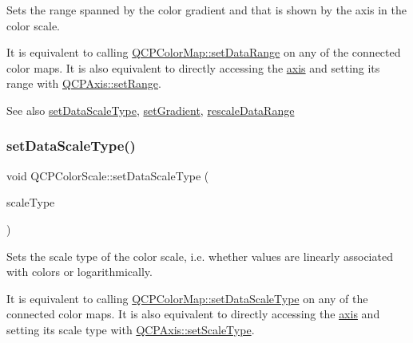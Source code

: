 Sets the range spanned by the color gradient and that is shown by the axis in the color scale.

It is equivalent to calling \mbox{\hyperlink{class_q_c_p_color_map_a980b42837821159786a85b4b7dcb8774}{Q\+C\+P\+Color\+Map\+::set\+Data\+Range}} on any of the connected color maps. It is also equivalent to directly accessing the \mbox{\hyperlink{class_q_c_p_color_scale_a39bdbdb3b212602a5a57f9f3ea444190}{axis}} and setting its range with \mbox{\hyperlink{class_q_c_p_axis_aebdfea5d44c3a0ad2b4700cd4d25b641}{Q\+C\+P\+Axis\+::set\+Range}}.

\begin{DoxySeeAlso}{See also}
\mbox{\hyperlink{class_q_c_p_color_scale_aeb6107d67dd7325145b2498abae67fc3}{set\+Data\+Scale\+Type}}, \mbox{\hyperlink{class_q_c_p_color_scale_a1f29583bb6f1e7f473b62fb712be3940}{set\+Gradient}}, \mbox{\hyperlink{class_q_c_p_color_scale_a425983db4478543924ddbd04ea20a356}{rescale\+Data\+Range}} 
\end{DoxySeeAlso}
\mbox{\label{class_q_c_p_color_scale_aeb6107d67dd7325145b2498abae67fc3}} 
\subsubsection{\texorpdfstring{setDataScaleType()}{setDataScaleType()}}
{\footnotesize\ttfamily void Q\+C\+P\+Color\+Scale\+::set\+Data\+Scale\+Type (\begin{DoxyParamCaption}\item[{\mbox{\hyperlink{class_q_c_p_axis_a36d8e8658dbaa179bf2aeb973db2d6f0}{Q\+C\+P\+Axis\+::\+Scale\+Type}}}]{scale\+Type }\end{DoxyParamCaption})}

Sets the scale type of the color scale, i.\+e. whether values are linearly associated with colors or logarithmically.

It is equivalent to calling \mbox{\hyperlink{class_q_c_p_color_map_a9d20aa08e3c1f20f22908c45b9c06511}{Q\+C\+P\+Color\+Map\+::set\+Data\+Scale\+Type}} on any of the connected color maps. It is also equivalent to directly accessing the \mbox{\hyperlink{class_q_c_p_color_scale_a39bdbdb3b212602a5a57f9f3ea444190}{axis}} and setting its scale type with \mbox{\hyperlink{class_q_c_p_axis_adef29cae617af4f519f6c40d1a866ca6}{Q\+C\+P\+Axis\+::set\+Scale\+Type}}.

